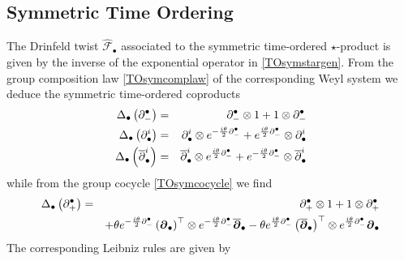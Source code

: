 \subsection{Symmetric Time Ordering}
\label{STOcoprod}
The Drinfeld twist $\hat{\mathcal F}_\bullet$ associated to the symmetric
time-ordered $\star$-product is given by the inverse of the exponential operator
in \eqref{TOsymstargen}. From the group composition law \eqref{TOsymcomplaw} of
the corresponding Weyl system we deduce the symmetric time-ordered coproducts
\begin{eqnarray}
  \label{STOcoprods}
  \Delta_\bullet\left(\partial_-^\bullet\right)&=&\partial_-^\bullet
  \otimes1+1\otimes\partial_-^\bullet \\\nonumber
  \Delta_\bullet\left(\partial^i_\bullet\right)&=&\partial^i_\bullet\otimes
  e^{-\frac{ i\theta}2 \partial_-^\bullet}+ e^{\frac{ i\theta}2 
    \partial_-^\bullet}\otimes\partial^i_\bullet \\\nonumber
  \Delta_\bullet\left( \overline{\partial}^{ i}_\bullet\right)&=&
  \overline{\partial}^{ i}_\bullet\otimes
  e^{\frac{ i\theta}2 \partial_-^\bullet}+ e^{-\frac{ i\theta}2 
    \partial_-^\bullet}\otimes\overline{\partial}^{ i}_\bullet
\end{eqnarray}
while from the group cocycle \eqref{TOsymcocycle} we find
\begin{eqnarray}
  \label{STOcoprodtime}
  \Delta_\bullet\left(\partial_+^\bullet\right)&=&\partial_+^\bullet\otimes1+
  1\otimes\partial_+^\bullet\\\nonumber &&
  + \theta  e^{-\frac{ i\theta}2 
    \partial_-^\bullet} \left({{\boldsymbol {\partial} }}_\bullet\right)^\top\otimes
  e^{-\frac{ i\theta}2 \partial_-^\bullet} \overline{{{\boldsymbol {\partial} }}}_\bullet-
  \theta  e^{\frac{ i\theta}2 \partial_-^\bullet}\left( 
    \overline{{{\boldsymbol {\partial} }}}_\bullet\right)^\top\otimes e^{\frac{ i\theta}2 
    \partial_-^\bullet} {{\boldsymbol {\partial} }}_\bullet
\end{eqnarray}
The corresponding Leibniz rules are given by

